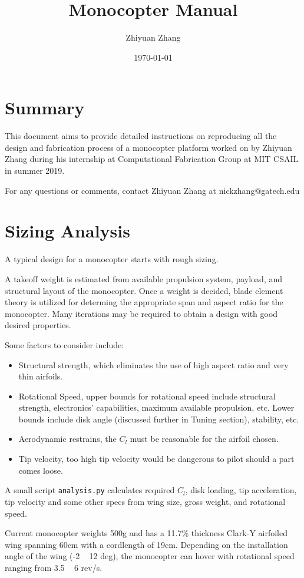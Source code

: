 \documentclass[12pt]{article}
\title{Monocopter Manual}
\author{Zhiyuan Zhang}
\date{\today}
\begin{document}
\maketitle
\section{Summary}
This document aims to provide detailed instructions on reproducing all the design and fabrication process of a monocopter platform worked on by Zhiyuan Zhang during his internship at Computational Fabrication Group at MIT CSAIL in summer 2019.

For any questions or comments, contact Zhiyuan Zhang at nickzhang@gatech.edu

\section{Sizing Analysis}
A typical design for a monocopter starts with rough sizing. 

A takeoff weight is estimated from available propulsion system, payload, and structural layout of the monocopter. Once a weight is decided, blade element theory is utilized for determing the appropriate span and aspect ratio for the monocopter. Many iterations may be required to obtain a design with good desired properties.

Some factors to consider include:
\begin{itemize}
  \item Structural strength, which eliminates the use of high aspect ratio and very thin airfoils.
  \item Rotational Speed, upper bounds for rotational speed include structural strength, electronics' capabilities, maximum available propulsion, etc. Lower bounds include disk angle (discussed further in Tuning section), stability, etc.
  \item Aerodynamic restrains, the $C_l$ must be reasonable for the airfoil chosen.
  \item Tip velocity, too high tip velocity would be dangerous to pilot should a part comes loose.
\end{itemize}

A small script \texttt{analysis.py} calculates required $C_l$, disk loading, tip acceleration, tip velocity and some other specs from wing size, gross weight, and rotational speed.

Current monocopter weights 500g and has a 11.7\% thickness Clark-Y airfoiled wing spanning 60cm with a cordlength of 19cm.
Depending on the installation angle of the wing (-2 ~ 12 deg), the monocopter can hover with rotational speed ranging from 3.5 ~ 6 rev/s. 
\end{document}
